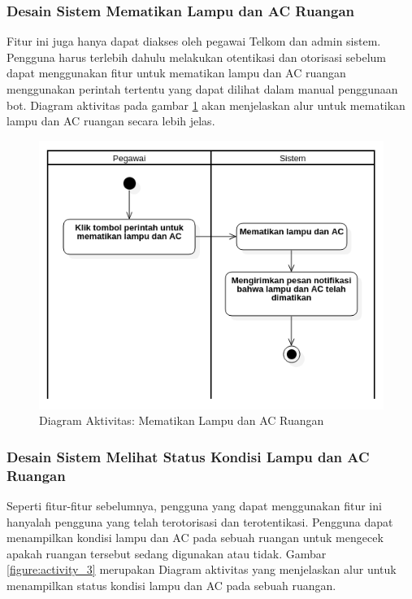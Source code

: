 \subsubsection{Desain Sistem Mematikan Lampu dan AC Ruangan}
\tab Fitur ini juga hanya dapat diakses oleh pegawai Telkom dan admin sistem. Pengguna harus terlebih dahulu melakukan otentikasi dan otorisasi sebelum dapat menggunakan fitur untuk mematikan lampu dan AC ruangan menggunakan perintah tertentu yang dapat dilihat dalam manual penggunaan bot. Diagram aktivitas pada gambar \ref{figure:activity_2} akan menjelaskan alur untuk mematikan lampu dan AC ruangan secara lebih jelas.

\begin{figure}[H]
	\centerline {
		\includegraphics[width=\linewidth]{bab4/img/activity_diagram_mematikan.png}
	}
	\caption{Diagram Aktivitas: Mematikan Lampu dan AC Ruangan}
	\label{figure:activity_2}
\end{figure}

\subsubsection{Desain Sistem Melihat Status Kondisi Lampu dan AC Ruangan}
\tab Seperti fitur-fitur sebelumnya, pengguna yang dapat menggunakan fitur ini hanyalah pengguna yang telah terotorisasi dan terotentikasi. Pengguna dapat menampilkan kondisi lampu dan AC pada sebuah ruangan untuk mengecek apakah ruangan tersebut sedang digunakan atau tidak. Gambar \ref{figure:activity_3} merupakan Diagram aktivitas yang menjelaskan alur untuk menampilkan status kondisi lampu dan AC pada sebuah ruangan.

